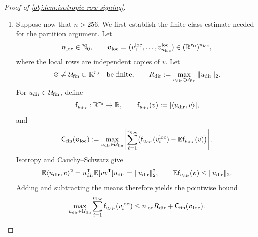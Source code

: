 \documentclass[11pt]{article}
\begin{document}
\begin{proof}[Proof of \cref{obj:lem:isotropic-row-signing}]
\begin{enumerate}
Since \(n\leq256\),
\[
\sqrt n\leq16,\qquad
n=(\sqrt n)^2\leq16\sqrt n,
\qquad
n^2\sqrt{r_0}\leq16n\sqrt{nr_0}.
\]
It follows that
\[
\mathbb E\mathsf M_{\rm sign}(\boldsymbol v)
\geq nr_0-16n\sqrt{nr_0}
\geq nr_0-n^2-16n\sqrt{nr_0}.
\]
The same calculation covers \(n=0\).

\item Suppose now that \(n>256\). We first establish the finite-class estimate needed for the partition argument.
Let
\[
n_{\rm loc}\in\mathbb N_0,\qquad
\boldsymbol v_{\rm loc}
=(v^{\rm loc}_1,\ldots,v^{\rm loc}_{n_{\rm loc}})
\in(\mathbb R^{r_0})^{n_{\rm loc}},
\]
where the local rows are independent copies of \(v\). Let
\[
\varnothing\ne\mathcal U_{\rm fin}\subset\mathbb R^{r_0}
\quad\text{be finite},\qquad
R_{\rm dir}:=\max_{u_{\rm dir}\in\mathcal U_{\rm fin}}
\|u_{\rm dir}\|_2.
\]
For \(u_{\rm dir}\in\mathcal U_{\rm fin}\), define
\[
\mathsf f_{u_{\rm dir}}:\mathbb R^{r_0}\to\mathbb R,
\qquad
\mathsf f_{u_{\rm dir}}(v):=|\langle u_{\rm dir},v\rangle|,
\]
and
\[
\mathsf C_{\rm fin}(\boldsymbol v_{\rm loc})
:=
\max_{u_{\rm dir}\in\mathcal U_{\rm fin}}
\left|
\sum_{i=1}^{n_{\rm loc}}
\bigl(\mathsf f_{u_{\rm dir}}(v_i^{\rm loc})
-\mathbb E\mathsf f_{u_{\rm dir}}(v)\bigr)
\right|.
\]
Isotropy and Cauchy--Schwarz give
\[
\mathbb E\langle u_{\rm dir},v\rangle^2
=u_{\rm dir}^{\mathsf T}\mathbb E[vv^{\mathsf T}]u_{\rm dir}
=\|u_{\rm dir}\|_2^2,
\qquad
\mathbb E\mathsf f_{u_{\rm dir}}(v)
\leq\|u_{\rm dir}\|_2.
\]
Adding and subtracting the means therefore yields the pointwise bound
\[
\max_{u_{\rm dir}\in\mathcal U_{\rm fin}}
\sum_{i=1}^{n_{\rm loc}}
\mathsf f_{u_{\rm dir}}(v_i^{\rm loc})
\leq n_{\rm loc}R_{\rm dir}
+\mathsf C_{\rm fin}(\boldsymbol v_{\rm loc}).
\]


\end{enumerate}
\end{proof}
\end{document}

